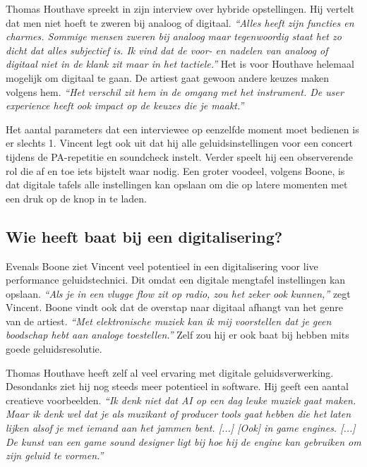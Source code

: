 Thomas Houthave spreekt in zijn interview over hybride opstellingen. \autocite{thomashouthave} Hij vertelt dat men niet hoeft te zweren bij analoog of digitaal. \textit{``Alles heeft zijn functies en charmes. Sommige mensen zweren bij analoog maar tegenwoordig staat het zo dicht dat alles subjectief is. Ik vind dat de voor- en nadelen van analoog of digitaal niet in de klank zit maar in het tactiele.''} \autocite{thomashouthave} Het is voor Houthave helemaal mogelijk om digitaal te gaan. De artiest gaat gewoon andere keuzes maken volgens hem. \textit{``Het verschil zit hem in de omgang met het instrument. De user experience heeft ook impact op de keuzes die je maakt.''}

Het aantal parameters dat een interviewee op eenzelfde moment moet bedienen is er slechts 1. \autocite{vagabundos} Vincent legt ook uit dat hij alle geluidsinstellingen voor een concert tijdens de PA-repetitie en soundcheck instelt. Verder speelt hij een observerende rol die af en toe iets bijstelt waar nodig. Een groter voodeel, volgens Boone, is dat digitale tafels alle instellingen kan opslaan om die op latere momenten met een druk op de knop in te laden.

\subsection{Wie heeft baat bij een digitalisering?}

Evenals Boone ziet Vincent veel potentieel in een digitalisering voor live performance geluidstechnici. Dit omdat een digitale mengtafel instellingen kan opslaan. \textit{``Als je in een vlugge flow zit op radio, zou het zeker ook kunnen,''} zegt Vincent. \autocite{bartvincent}\newline Boone vindt ook dat de overstap naar digitaal afhangt van het genre van de artiest. \textit{``Met elektronische muziek kan ik mij voorstellen dat je geen boodschap hebt aan analoge toestellen.''} \autocite{peterboone} Zelf zou hij er ook baat bij hebben mits goede geluidsresolutie.

Thomas Houthave heeft zelf al veel ervaring met digitale geluidsverwerking. Desondanks ziet hij nog steeds meer potentieel in software. Hij geeft een aantal creatieve voorbeelden. \textit{``Ik denk niet dat AI op een dag leuke muziek gaat maken. Maar ik denk wel dat je als muzikant of producer tools gaat hebben die het laten lijken alsof je met iemand aan het jammen bent. [...] [Ook] in game engines. [...] De kunst van een game sound designer ligt bij hoe hij de engine kan gebruiken om zijn geluid te vormen.''} \autocite{thomashouthave}

